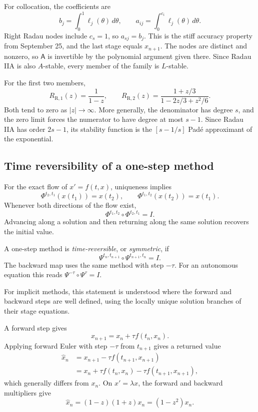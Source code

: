 For collocation, the coefficients are
\[
 b_j=\int_0^1\ell_j(\theta)\,d\theta,\qquad
 a_{ij}=\int_0^{c_i}\ell_j(\theta)\,d\theta.
\]
Right Radau nodes include \(c_s=1\), so \(a_{sj}=b_j\).
This is the stiff accuracy property from September 25, and the
last stage equals \(x_{n+1}\). The nodes are distinct and nonzero,
so \(\mathsf A\) is invertible by the polynomial argument given
there. Since Radau IIA is also \(A\)-stable, every member of the
family is \(L\)-stable.

For the first two members,
\[
 R_{\mathrm{R},1}(z)=\frac1{1-z},\qquad
 R_{\mathrm{R},2}(z)=\frac{1+z/3}{1-2z/3+z^2/6}.
\]
Both tend to zero as \(|z|\to\infty\). More generally, the
denominator has degree \(s\), and the zero limit forces the
numerator to have degree at most \(s-1\). Since Radau IIA has
order \(2s-1\), its stability function is the \([s-1/s]\)
Pad\'e approximant of the exponential.

\subsection{Time reversibility of a one-step method}

For the exact flow of \(x'=f(t,x)\), uniqueness implies
\[
 \Phi^{t_2,t_1}(x(t_1))=x(t_2),\qquad
 \Phi^{t_1,t_2}(x(t_2))=x(t_1).
\]
Whenever both directions of the flow exist,
\begin{equation}\label{eq:exact-reversibility-sep-28}
 \Phi^{t_1,t_2}\circ\Phi^{t_2,t_1}=I.
\end{equation}
Advancing along a solution and then returning along the same
solution recovers the initial value.

\begin{definition}
 A one-step method is \emph{time-reversible}, or
 \emph{symmetric}, if
 \begin{equation}\label{eq:numerical-reversibility-sep-28}
  \Psi^{t_n,t_{n+1}}\circ\Psi^{t_{n+1},t_n}=I.
 \end{equation}
 The backward map uses the same method with step \(-\tau\).
 For an autonomous equation this reads
 \(\Psi^{-\tau}\circ\Psi^\tau=I\).
\end{definition}

For implicit methods, this statement is understood where the
forward and backward steps are well defined, using the locally
unique solution branches of their stage equations.

\begin{example}
 A forward step gives
 \[
  x_{n+1}=x_n+\tau f(t_n,x_n).
 \]
 Applying forward Euler with step \(-\tau\) from \(t_{n+1}\)
 gives a returned value
 \begin{align*}
  \widehat x_n
   &=x_{n+1}-\tau f(t_{n+1},x_{n+1})\\
   &=x_n+\tau f(t_n,x_n)-\tau f(t_{n+1},x_{n+1}),
 \end{align*}
 which generally differs from \(x_n\). On \(x'=\lambda x\),
 the forward and backward multipliers give
 \[
  \widehat x_n=(1-z)(1+z)x_n=(1-z^2)x_n.
 \]
\end{example}


